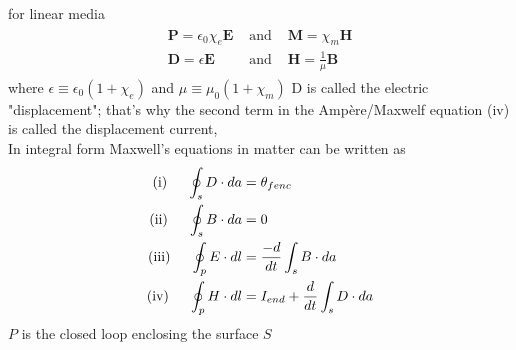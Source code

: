 for linear media
\begin{align*}
\begin{array}{lll}
\mathbf{P}=\epsilon_{0} \chi_{e} \mathbf{E} &\text{ and }& \mathbf{M}=\chi_{m} \mathbf{H}\\
\mathbf{D}=\epsilon \mathbf{E}&\text{ and }&\mathbf{H}=\frac{1}{\mu} \mathbf{B}
\end{array}
\end{align*}
where $\epsilon \equiv \epsilon_{0}\left(1+\chi_{e}\right)$ and $\mu \equiv \mu_{0}\left(1+\chi_{m}\right)$ D is called the electric "displacement"; that's why the second term in the Ampère/Maxwelf equation (iv) is called the displacement current,\\
In integral form Maxwell's equations in matter can be written as\\
\begin{align*}
\text{(i)}\hspace{0.5cm}\oint_{s}D\cdot da&=\theta_{fenc}\\
\text{(ii)}\hspace{0.5cm}\oint_{s}B\cdot da&=0\\
\text{(iii)}\hspace{0.5cm}\oint_{p}E\cdot dl&=\frac{-d}{dt}\int_{s} B\cdot da\\
\text{(iv)}\hspace{0.5cm}\oint_{p}H\cdot dl&=I_{end}+\frac{d}{dt}\int_{s} D\cdot da
\end{align*}
$P$ is the closed loop enclosing the surface $S$
